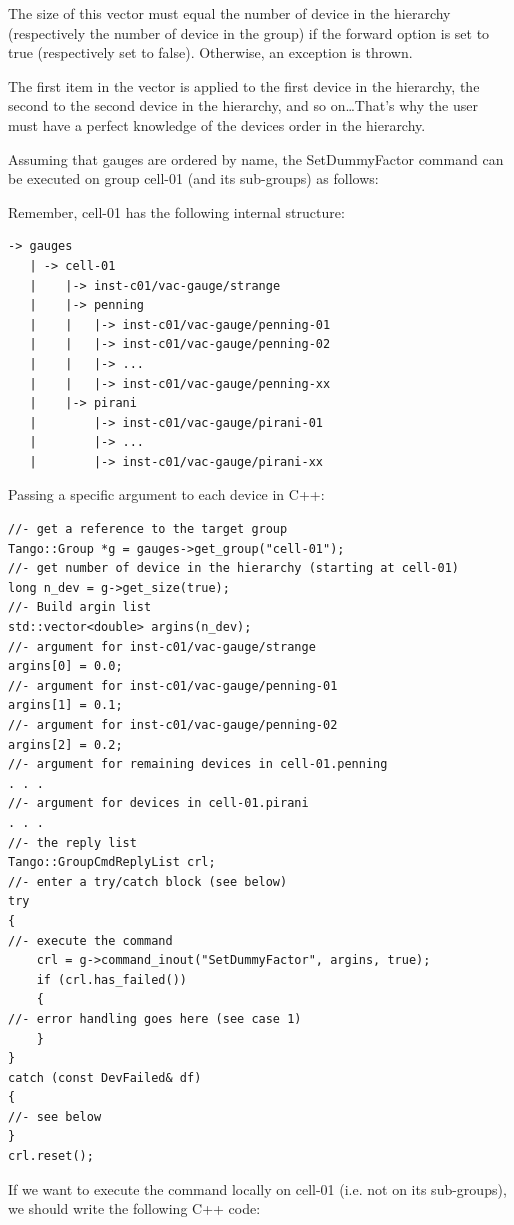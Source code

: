 The size of this vector must equal the number of device in the hierarchy
(respectively the number of device in the group) if the forward
option is set to true (respectively set to false). Otherwise, an exception
is thrown.

The first item in the vector is applied to the first device in the
hierarchy, the second to the second device in the hierarchy, and so
on\ldots{}That's why the user must have a \textquotedbl{}perfect\textquotedbl{}
knowledge of the devices order in the hierarchy. 

Assuming that gauges are ordered by name, the SetDummyFactor command
can be executed on group \textquotedbl{}cell-01\textquotedbl{} (and
its sub-groups) as follows:

Remember, \textquotedbl{}cell-01\textquotedbl{} has the following
internal structure: 
\begin{verbatim}
-> gauges
   | -> cell-01
   |    |-> inst-c01/vac-gauge/strange
   |    |-> penning
   |    |   |-> inst-c01/vac-gauge/penning-01
   |    |   |-> inst-c01/vac-gauge/penning-02
   |    |   |-> ...
   |    |   |-> inst-c01/vac-gauge/penning-xx
   |    |-> pirani
   |        |-> inst-c01/vac-gauge/pirani-01
   |        |-> ...
   |        |-> inst-c01/vac-gauge/pirani-xx
\end{verbatim}
Passing a specific argument to each device in C++:


\begin{verbatim}
//- get a reference to the target group
Tango::Group *g = gauges->get_group("cell-01");
//- get number of device in the hierarchy (starting at cell-01)
long n_dev = g->get_size(true);
//- Build argin list
std::vector<double> argins(n_dev);
//- argument for inst-c01/vac-gauge/strange
argins[0] = 0.0;
//- argument for inst-c01/vac-gauge/penning-01
argins[1] = 0.1;
//- argument for inst-c01/vac-gauge/penning-02
argins[2] = 0.2;
//- argument for remaining devices in cell-01.penning
. . .
//- argument for devices in cell-01.pirani
. . .
//- the reply list
Tango::GroupCmdReplyList crl;
//- enter a try/catch block (see below)
try
{
//- execute the command
    crl = g->command_inout("SetDummyFactor", argins, true);
    if (crl.has_failed())
    {
//- error handling goes here (see case 1)
    }
}
catch (const DevFailed& df)
{
//- see below
}
crl.reset();
\end{verbatim}


If we want to execute the command locally on \textquotedbl{}cell-01\textquotedbl{}
(i.e. not on its sub-groups), we should write the following C++ code:


